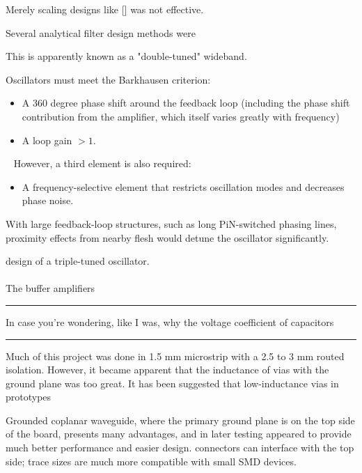 \documentclass[paper.tex]{subfiles}
\begin{document}
Merely scaling designs like [] was not effective.





Several analytical filter design methods were 

This is apparently known as a "double-tuned" wideband.


Oscillators must meet the Barkhausen criterion:

\begin{itemize}

\item A 360 degree phase shift around the feedback loop (including the phase shift contribution from the amplifier, which itself varies greatly with frequency)
\item A loop gain $>1.$ 

\end{itemize}\
%
However, a third element is also required:
%
\begin{itemize}
\item A frequency-selective element that restricts oscillation modes and decreases phase noise.
\end{itemize}
%

With large feedback-loop structures, such as long PiN-switched phasing lines, proximity effects from nearby flesh would detune the oscillator significantly.

 design of a triple-tuned oscillator.


\paragraph{}
The buffer amplifiers 


\rule{\linewidth}{0.2pt}

In case you're wondering, like I was, why the voltage coefficient of capacitors 

\rule{\linewidth}{0.2pt}

Much of this project was done in 1.5 mm microstrip with a 2.5 to 3 mm routed isolation. However, it became apparent that the inductance of vias with the ground plane was too great. It has been suggested that low-inductance vias in prototypes \cite{Microwavee}

Grounded coplanar waveguide, where the primary ground plane is on the top side of the board, presents many advantages, and in later testing appeared to provide much better performance and easier design. connectors can interface with the top side; trace sizes are much more compatible with small SMD devices.
\end{document}

